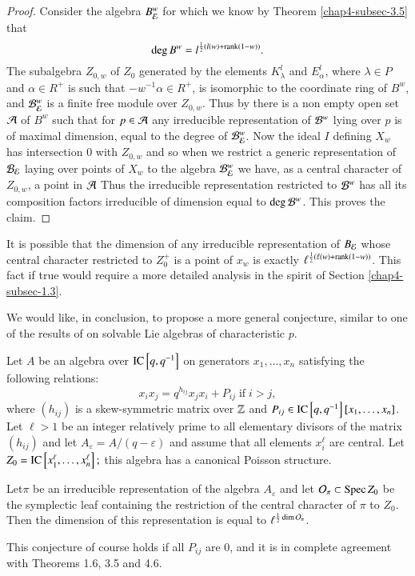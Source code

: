 \begin{proof}
Consider the algebra $B_{\mathcal{E}}^{w}$ for which we know by Theorem \ref{chap4-subsec-3.5} that
$$
\deg B^{w} = l^{\frac{1}{2}(l(w)+\operatorname{rank}(1-w))}.
$$
The subalgebra $Z_{0, w}$ of $Z_{0}$ generated by the elements $K_{\lambda}^{l}$ and $E_{\alpha}^{l}$, where $\lambda \in P$ and $\alpha \in R^{+}$ is such that $-w^{-1}\alpha \in R^{+}$, is isomorphic to the coordinate ring of $B^{w}$, and $\mathcal{B}_{\mathcal{E}}^{w}$ is a finite free module over $Z_{0, w}$. Thus by \cite{chap4-keyDKP2} there is a non empty open set $\mathcal{A}$ of $B^{w}$ such that for  $p\in \mathcal{A}$ any irreducible representation of $\mathcal{B}^{w}$ lying over $p$ is of maximal dimension, equal to the degree of $\mathcal{B}_{\mathcal{E}}^{w}$. Now the ideal $I$ defining $X_{w}$ has intersection $0$ with $Z_{0, w}$ and so when we restrict a generic representation of $\mathcal{B}_{\mathcal{E}}$ laying over points of $X_{w}$ to the algebra $\mathcal{B}_{\mathcal{E}}^{w}$ we have, as a central character of $Z_{0, w}$, a point in $\mathcal{A}$ Thus the irreducible representation restricted to $\mathcal{B}^{w}$ has all its composition factors irreducible of dimension equal to $\deg\mathcal{B}^{w}$. This proves the claim.  
\end{proof}

It is possible that the dimension of any irreducible representation of $B_{\mathcal{E}}$ whose central character restricted to $Z_{0}^{+}$ is  a point of $x_{w}$ is exactly $\ell^{\frac{1}{2}(\ell(w)+\operatorname{rank}(1-w))}$. This fact if true would require a more detailed analysis in the spirit of Section \ref{chap4-subsec-1.3}.

We would like, in conclusion, to propose a more general conjecture, similar to one of the results of \cite{chap4-keyWK} on solvable Lie algebras of characteristic $p$.

Let $A$ be an algebra over ${\operatorname{IC}}\left[q, q^{-1}\right]$ on generators $x_{1}, \ldots, x_{n}$ satisfying the following relations:
$$
x_{i}x_{j}= q^{h_{ij}}x_{j}x_{i}+ P_{ij}\; \text{if} \; i > j,
$$
where $(h_{ij})$ is a skew-symmetric matrix over $\mathbb{Z}$ and $P_{ij}\in \IC\left[q, q^{-1}\right]\break\left[x_{1}, \ldots, x_{n}\right]$. Let $\ell > 1$ be an integer relatively prime to all elementary divisors of the matrix $(h_{ij})$ and let $A_{\varepsilon} = A/(q -\varepsilon)$ and assume that all elements $x_{i}^{\ell}$ are central. Let $Z_{0} = \operatorname{IC}\left[x_{1}^{\ell}, \ldots, x_{n}^{\ell}\right];$ this algebra has a canonical Poisson structure.

\begin{conjecture*}
Let\pageoriginale $\pi$ be an irreducible representation of the algebra $A_{\varepsilon}$ and let $\mathcal{O}_{\pi} \subset \operatorname{Spec} Z_{0}$ be the symplectic leaf containing the restriction of the central character of $\pi$ to $Z_{0}$. Then the dimension of this representation is equal to $\ell^{\frac{1}{2}\dim \mathcal{O}_{\pi}}$.

This conjecture of course holds if all $P_{ij}$ are 0, and it is in complete agreement with Theorems 1.6, 3.5 and 4.6.
\end{conjecture*}

